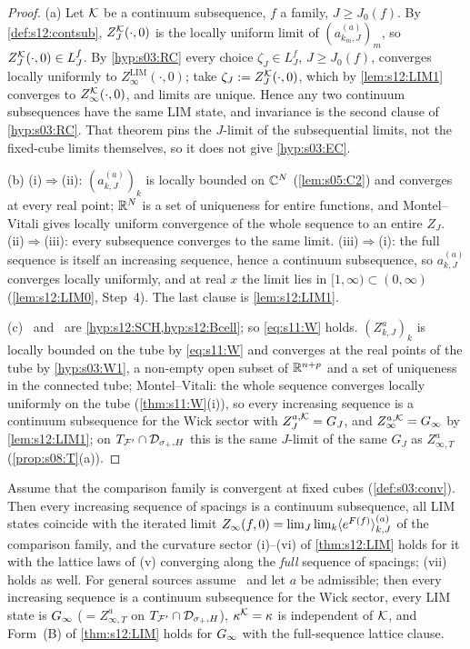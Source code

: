 \begin{proof}
(a) Let $\mathcal K$ be a continuum subsequence, $f$ a family, $J\ge J_0(f)$. By \cref{def:s12:contsub}, $Z^{\mathcal K}_J(\cdot,0)$ is the locally uniform limit of $(a^{(a)}_{k_m,J})_m$, so $Z^{\mathcal K}_J(\cdot,0)\in L^f_J$. By \cref{hyp:s03:RC} every choice $\zeta_J\in L^f_J$, $J\ge J_0(f)$, converges locally uniformly to $Z^{\mathrm{LIM}}_\infty(\cdot,0)$; take $\zeta_J:= Z^{\mathcal K}_J(\cdot,0)$, which by \cref{lem:s12:LIM1} converges to $Z^{\mathcal K}_{\infty}(\cdot,0)$, and limits are unique. Hence any two continuum subsequences have the same LIM state, and invariance is the second clause of \cref{hyp:s03:RC}. That theorem pins the $J$-limit of the subsequential limits, not the fixed-cube limits themselves, so it does not give \cref{hyp:s03:EC}.

(b) (i)$\Rightarrow$(ii): $(a^{(a)}_{k,J})_k$ is locally bounded on $\mathbb C^N$ (\cref{lem:s05:C2}) and converges at every real point; $\mathbb R^N$ is a set of uniqueness for entire functions, and Montel--Vitali gives locally uniform convergence of the whole sequence to an entire $Z_J$. (ii)$\Rightarrow$(iii): every subsequence converges to the same limit. (iii)$\Rightarrow$(i): the full sequence is itself an increasing sequence, hence a continuum subsequence, so $a^{(a)}_{k,J}$ converges locally uniformly, and at real $x$ the limit lies in $[1,\infty)\subset(0,\infty)$ (\cref{lem:s12:LIM0}, Step~4). The last clause is \cref{lem:s12:LIM1}.

(c) \SCH\ and \Bcell\ are \cref{hyp:s12:SCH,hyp:s12:Bcell}; so \eqref{eq:s11:W} holds. $(Z^a_{k,J})_k$ is locally bounded on the tube by \eqref{eq:s11:W} and converges at the real points of the tube by \cref{hyp:s03:W1}, a non-empty open subset of $\mathbb R^{n+p}$ and a set of uniqueness in the connected tube; Montel--Vitali: the whole sequence converges locally uniformly on the tube (\cref{thm:s11:W}(i)), so every increasing sequence is a continuum subsequence for the Wick sector with $Z^{a,\mathcal K}_J=G_J$, and $Z^{a,\mathcal K}_\infty=G_\infty$ by \cref{lem:s12:LIM1}; on $T_{\mathcal F'}\cap\mathcal D_{\sigma_+,H}$ this is the same $J$-limit of the same $G_J$ as $Z^a_{\infty,T}$ (\cref{prop:s08:T}(a)).
\end{proof}

\begin{corollary}\label{cor:s12:K}
Assume that the comparison family is convergent at fixed cubes (\cref{def:s03:conv}). Then every increasing sequence of spacings is a continuum subsequence, all LIM states coincide with the iterated limit $Z_\infty(f,0)=\lim_J\lim_k\langle e^{F(f)}\rangle^{(a)}_{k,J}$ of the comparison family, and the curvature sector (i)--(vi) of \cref{thm:s12:LIM} holds for it with the lattice laws of (v) converging along the \emph{full} sequence of spacings; (vii) holds as well. For general sources assume \Tthree\ and let $a$ be admissible; then every increasing sequence is a continuum subsequence for the Wick sector, every LIM state is $G_\infty$ ($=Z^a_{\infty,T}$ on $T_{\mathcal F'}\cap\mathcal D_{\sigma_+,H}$), $\kappa^{\mathcal K}=\kappa$ is independent of $\mathcal K$, and Form~(B) of \cref{thm:s12:LIM} holds for $G_\infty$ with the full-sequence lattice clause.
\end{corollary}

